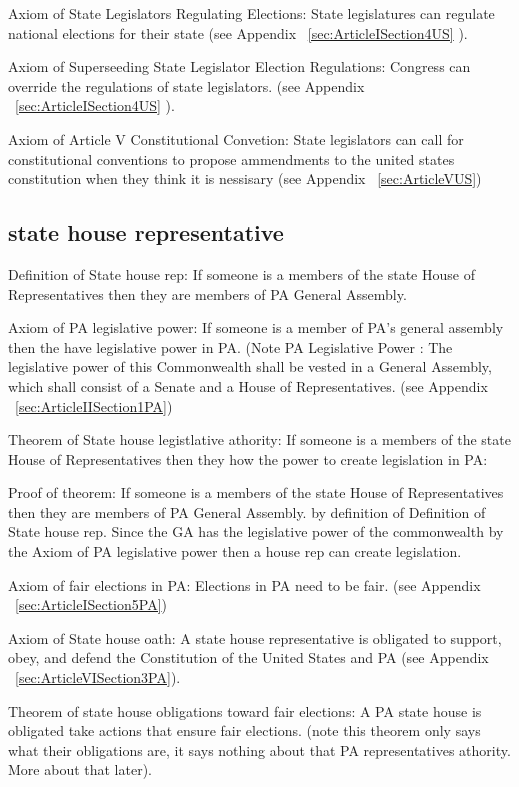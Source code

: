 \documentclass[11pt]{article} %
\begin{document}
\begin{enumerate}
Axiom of State Legislators Regulating Elections: State legislatures can regulate national elections for their state (see Appendix ~\ref{sec:ArticleISection4US} ).

Axiom of Superseeding State Legislator Election Regulations:  Congress can override the regulations of state legislators.   (see Appendix ~\ref{sec:ArticleISection4US} ).

Axiom of Article V Constitutional Convetion:  State legislators can call for constitutional conventions to propose ammendments to the united states constitution when they think it is nessisary (see Appendix  ~\ref{sec:ArticleVUS})

\subsection{state house representative}

Definition of State house rep: If someone is a members of the state House of Representatives then they are members of PA General Assembly.

Axiom of PA legislative power:  If someone is a member of PA's general assembly then the have legislative power in PA.  (Note PA Legislative Power : The legislative power of this Commonwealth shall be vested in a General Assembly, which shall consist of a Senate and a House of Representatives. (see Appendix ~\ref{sec:ArticleIISection1PA})

Theorem of State house legistlative athority: If someone is a members of the state House of Representatives then they how the power to create legislation in PA: 

Proof of theorem:
If someone is a members of the state House of Representatives then they are members of PA General Assembly. by definition of Definition of State house rep.  Since the GA has the legislative power of the commonwealth by the Axiom of PA legislative power then a house rep can create legislation. 

Axiom of fair elections in PA: Elections in PA need to be fair. (see Appendix ~\ref{sec:ArticleISection5PA})

Axiom of State house oath: A state house representative is obligated to support, obey, and defend the  Constitution of the United States and PA (see Appendix ~\ref{sec:ArticleVISection3PA}).

Theorem of state house obligations toward fair elections:  A PA state house is obligated take actions that ensure fair elections. (note this theorem only says what their obligations are, it says nothing about that PA representatives athority. More about that later).


\end{enumerate}
\end{document}

